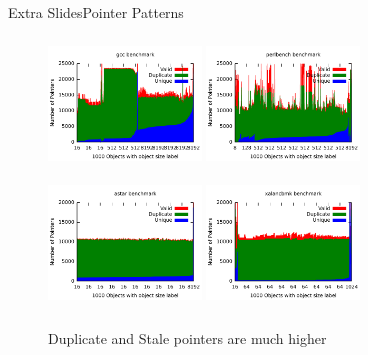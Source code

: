 \documentclass{beamer}
\newenvironment{figure*}%
{\begin{figure}}
{\end{figure}}
\begin{document}
\begin{frame}{Extra Slides}{Pointer Patterns}
\begin{figure}[!t]
\center
  \includegraphics[width=1.6in,height=1.4in,keepaspectratio]{plots/gcc_pointerpattern.pdf}
  \includegraphics[width=1.6in,height=1.4in,keepaspectratio]{plots/perlbench_pointerpattern.pdf} \\
  \includegraphics[width=1.6in,height=1.4in,keepaspectratio]{plots/astar_pointerpattern.pdf}
  \includegraphics[width=1.6in,height=1.4in,keepaspectratio]{plots/xalancbmk_pointerpattern.pdf}
  
\begin{block}{}
Duplicate and Stale pointers are much higher
\end{block}
  
  \vspace{-1em}
\end{figure}
\end{frame}
\end{document}
